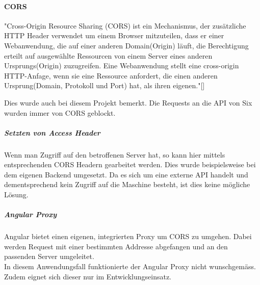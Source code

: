 \paragraph{CORS}\label{CORS}
"Cross-Origin Resource Sharing (CORS) ist ein Mechanismus, der zusätzliche HTTP Header verwendet um einem Browser mitzuteilen, dass er einer Webanwendung, die auf einer anderen Domain(Origin) läuft, die Berechtigung erteilt auf ausgewählte Ressourcen von einem Server eines anderen Ursprungs(Origin) zuzugreifen. Eine Webanwendung stellt eine cross-origin HTTP-Anfage, wenn sie eine Ressource anfordert, die einen anderen Ursprung(Domain, Protokoll und Port) hat, als ihren eigenen."[\cite{cors}]

Dies wurde auch bei diesem Projekt bemerkt. Die Requests an die API von Six wurden immer von \ac{CORS} geblockt. 

\subparagraph{Setzten von Access Header}
Wenn man Zugriff auf den betroffenen Server hat, so kann hier mittels entsprechenden CORS Headern gearbeitet werden. Dies wurde beispielsweise bei dem eigenen Backend umgesetzt. Da es sich um eine externe API handelt und dementsprechend kein Zugriff auf die Maschine besteht, ist dies keine mögliche Lösung. 

\subparagraph{Angular Proxy}
Angular bietet einen eigenen, integrierten Proxy um \ac{CORS} zu umgehen. Dabei werden Request mit einer bestimmten Addresse abgefangen und an den passenden Server umgeleitet.\\
In diesem Anwendungsfall funktionierte der Angular Proxy nicht wunschgemäss. Zudem eignet sich dieser nur im Entwicklungseinsatz. 


